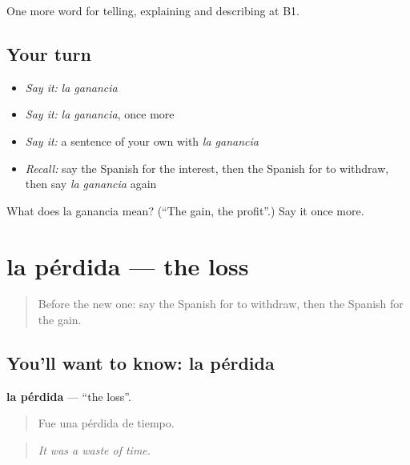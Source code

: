 \begin{grammarlens}[title={What you've built}]
One more word for telling, explaining and describing at B1.
\end{grammarlens}

\subsection*{Your turn}
\begin{itemize}
\raggedright
  \item \emph{Say it:} \emph{la ganancia}
  \item \emph{Say it:} \emph{la ganancia}, once more
  \item \emph{Say it:} a sentence of your own with \emph{la ganancia}
  \item \emph{Recall:} say the Spanish for the interest, then the Spanish for to withdraw, then say \emph{la ganancia} again
\end{itemize}

\begin{tcolorbox}[breakable,colback=teal!4,colframe=teal!35!black,title={Before you move on}]
What does la ganancia mean? (\textquotedblleft{}The gain, the profit\textquotedblright{}.) Say it once more.
\end{tcolorbox}
\section[la pérdida]{la pérdida — the loss}

\label{lesson:ES-C629-perdida}



\begin{quote}
Before the new one: say the Spanish for to withdraw, then the Spanish for the gain.
\end{quote}

\subsection*{You'll want to know: la pérdida}
\textbf{la pérdida} — \textquotedblleft{}the loss\textquotedblright{}.

\begin{quote}
Fue una pérdida de tiempo.
\end{quote}

\begin{quote}
\emph{It was a waste of time.}
\end{quote}

